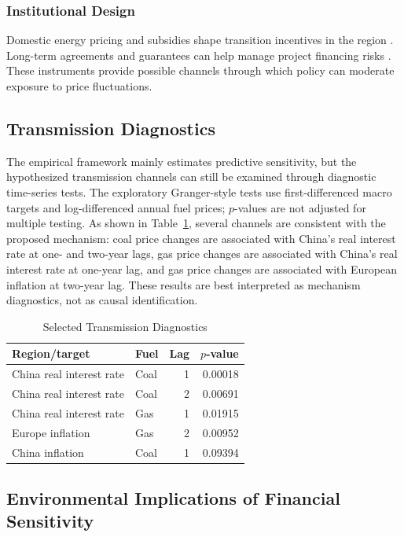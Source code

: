 \subsubsection{Institutional Design}

Domestic energy pricing and subsidies shape transition incentives in the region \cite{FATTOUH2013108}. Long-term agreements and guarantees can help manage project financing risks \cite{duma2023risk}. These instruments provide possible channels through which policy can moderate exposure to price fluctuations.

\subsection{Transmission Diagnostics}

The empirical framework mainly estimates predictive sensitivity, but the hypothesized transmission channels can still be examined through diagnostic time-series tests. The exploratory Granger-style tests use first-differenced macro targets and log-differenced annual fuel prices; $p$-values are not adjusted for multiple testing. As shown in Table~\ref{tab:granger}, several channels are consistent with the proposed mechanism: coal price changes are associated with China's real interest rate at one- and two-year lags, gas price changes are associated with China's real interest rate at one-year lag, and gas price changes are associated with European inflation at two-year lag. These results are best interpreted as mechanism diagnostics, not as causal identification.

\begin{table}[t]
\centering
\caption{Selected Transmission Diagnostics}
\label{tab:granger}
\scriptsize
\begin{tabular}{llrr}
\toprule
\textbf{Region/target} & \textbf{Fuel} & \textbf{Lag} & \textbf{$p$-value} \\
\midrule
China real interest rate & Coal & 1 & 0.00018 \\
China real interest rate & Coal & 2 & 0.00691 \\
China real interest rate & Gas & 1 & 0.01915 \\
Europe inflation & Gas & 2 & 0.00952 \\
China inflation & Coal & 1 & 0.09394 \\
\bottomrule
\end{tabular}
\end{table}

\subsection{Environmental Implications of Financial Sensitivity}


